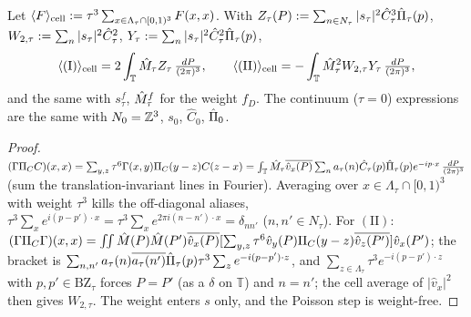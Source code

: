 \begin{lemma}\label{app:a04:lem:cell}
Let $\langle F\rangle_{\mathrm{cell}}:=\tau^3\sum_{x\in\Lambda_\tau\cap[0,1)^3}F(x,x)$. With $Z_\tau(P):=\sum_{n\in N_\tau}|s_\tau|^2\hat C_\tau^3\hat\Pi_\tau(p)$, $W_{2,\tau}:=\sum_n|s_\tau|^2\hat C_\tau^2$, $Y_\tau:=\sum_n|s_\tau|^2\hat C_\tau^2\hat\Pi_\tau(p)$,
\[
\langle(\mathrm I)\rangle_{\mathrm{cell}}=2\int_{\mathbb T}\hat M_\tau Z_\tau\,\tfrac{dP}{(2\pi)^3},\qquad\langle(\mathrm{II})\rangle_{\mathrm{cell}}=-\int_{\mathbb T}\hat M_\tau^2W_{2,\tau}Y_\tau\,\tfrac{dP}{(2\pi)^3},
\]
and the same with $s^f_\tau$, $\hat M^f_\tau$ for the weight $f_D$. The continuum ($\tau=0$) expressions are the same with $N_0=\mathbb Z^3$, $s_0$, $\hat C_0$, $\hat\Pi_0$.
\end{lemma}
\begin{proof}
$(\Gamma\Pi_CC)(x,x)=\sum_{y,z}\tau^6\Gamma(x,y)\Pi_C(y-z)C(z-x)=\int_{\mathbb T}\hat M_\tau\overline{\hat v_x(P)}\sum_na_\tau(n)\hat C_\tau(p)\hat\Pi_\tau(p)e^{-ip\cdot x}\,\tfrac{dP}{(2\pi)^3}$ (sum the translation-invariant lines in Fourier). Averaging over $x\in\Lambda_\tau\cap[0,1)^3$ with weight $\tau^3$ kills the off-diagonal aliases, $\tau^3\sum_xe^{i(p-p')\cdot x}=\tau^3\sum_xe^{2\pi i(n-n')\cdot x}=\delta_{nn'}$ ($n,n'\in N_\tau$). For $(\mathrm{II})$: $(\Gamma\Pi_C\Gamma)(x,x)=\iint\hat M(P)\hat M(P')\overline{\hat v_x(P)}[\sum_{y,z}\tau^6\hat v_y(P)\Pi_C(y-z)\overline{\hat v_z(P')}]\hat v_x(P')$; the bracket is $\sum_{n,n'}a_\tau(n)\overline{a_\tau(n')}\hat\Pi_\tau(p)\tau^3\sum_ze^{-i(p-p')\cdot z}$, and $\sum_{z\in\Lambda_\tau}\tau^3e^{-i(p-p')\cdot z}$ with $p,p'\in\mathrm{BZ}_\tau$ forces $P=P'$ (as a $\delta$ on $\mathbb T$) and $n=n'$; the cell average of $|\hat v_x|^2$ then gives $W_{2,\tau}$. The weight enters $s$ only, and the Poisson step is weight-free.
\end{proof}

